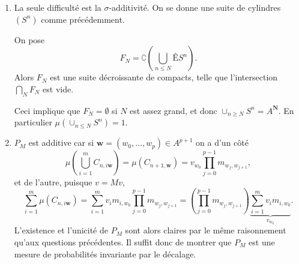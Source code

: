 \documentclass[a4paper,12pt,openany]{article}
\theoremstyle{plain}
\theoremstyle{definition}
\newcommand{\dd}{\mathrm{d}}
\newcommand{\N}{\mathbf{N}}
\newcommand{\Fcal}{\mathcal{F}}
\begin{document}
\begin{enumerate}
\begin{enumerate}
Alors par (a) on a
$$
\int_A H_{k+1}(x_0, \dots, x_k, x) \dd P(x) = H_k(x_0, \dots, x_k) < 1.
$$
Ainsi il existe $x_{k+1} \in A$ tel que $H_{k+1}(x_0, \dots, x_{k+1}) < 1$.
\item Par la question \textbf{2.}, l'application $\mu$ s'\'etend uniquement en une mesure additive sur l'ensemble des unions de cylindres. On veut appliquer le th\'eor\`eme de Carath\'edory. Pour cela, on aimerait montrer que $\mu$ est $\sigma$-additive (il suffit de le montrer sur les cylindres). Soit $(S^n)$ une suite de cylindres deux-\`a-deux disjoints telle que $X = \cup_n S^n$. On suppose par l'absurde que $\sum_n \mu(S^n) < 1.$ Par (b), il existe une suite $\mathbf{x} = (x_n)$ telle que $H_k(x_0, \dots, x_k) < 1$ pour tout $k$. Soit $m \in \N$ tel que $x \in S^m$, et $i_m \in \N$ tel que $S^m_i = A$ pour tout $j > i_m.$ Alors on a
$$
\left(\prod_{j > i_m}P(S^m_i)\right) \left(\prod_{i=0}^{i_m} 1_{S^m_i}(x_i)\right) = 1,
$$
et donc 
$$
H_{i_m}(x_0, \dots x_{i_m}) \geqslant \left(\prod_{j > i_m}P(S^m_i)\right) \left(\prod_{i=0}^{i_m} 1_{S^m_i}(x_i)\right) = 1,
$$
ce qui est absurde.

Montrons maintenant que $\mu$ est invariante par le d\'ecalage $\sigma : X \to X$. d\'efini par
$$
\sigma : (x_n) \mapsto (x_{n+1}).
$$ 
Soit $S = S_0 \times S_1 \times \cdots$ un cylindre. Alors
$$\sigma^{-1}(S) = A \times S_0 \times S_1 \times \cdots,$$
et donc $\mu(\sigma^{-1}(S)) = \mu(S).$ Cette \'egalit\'e est donc aussi vraie pour tout $S \in \Fcal^{\otimes \N}.$

\end{enumerate}

\item La seule difficult\'e est la $\sigma$-additivit\'e. On se donne une suite de cylindres $(S^n)$ comme pr\'ec\'edemment.


On pose 
$$
F_N = \complement \left(\bigcup_{n \leqslant N}ÊS^n\right).
$$
Alors $F_N$ est une suite d\'ecroissante de compacts, telle que l'intersection $\bigcap_N F_N$ est vide. 


Ceci implique que $F_N = \emptyset$ si $N$ est assez grand, et donc $\cup_{n \geqslant N} S^n = A^{\N}$. En particulier $\mu(\cup_{n \leqslant N} S^n) = 1.$


\item $P_M$ est additive car si $\mathbf{w} = (w_0, \dots, w_p) \in A^{p+1}$ on a d'un c\^ot\'e
$$
\mu\left(\bigcup_{i=1}^m C_{n, i\mathbf{w}}\right) = \mu(C_{n+1, \mathbf{w}}) = v_{w_0} \prod_{j=0}^{p-1} m_{w_j, w_{j+1}},
$$
et de l'autre, puisque $v = Mv$,
$$
\sum_{i=1}^m \mu(C_{n,i\mathbf{w}}) = \sum_{i=1}^m v_i m_{i, w_0}\prod_{j=0}^{p-1}m_{w_j, w_{j+1}} = \left(\prod_{j=0}^{p-1}m_{w_j, w_{j+1}}\right) \underset{v_{w_0}}{\underbrace{\sum_{i=1}^m v_i m_{i, w_0}}}.
$$
L'existence et l'unicit\'e de $P_M$ sont alors claires par le m\^eme raisonnement qu'aux questions pr\'ec\'edentes. Il suffit donc de montrer que $P_M$ est une mesure de probabilit\'es invariante par le d\'ecalage.


\end{enumerate}
\end{document}
